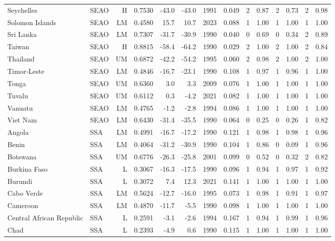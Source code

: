 \begin{longtable}{llrrrrrrrrrrrr}
Seychelles & SEAO & H & 0.7530 & -43.0 & -43.0 & 1991 & 0.049 & 2 & 0.87 & 2 & 0.73 & 2 & 0.98 \\
Solomon Islands & SEAO & LM & 0.4580 &  15.7 &  10.7 & 2023 & 0.088 & 1 & 1.00 & 1 & 1.00 & 1 & 1.00 \\
Sri Lanka & SEAO & LM & 0.7307 & -31.7 & -30.9 & 1990 & 0.040 & 0 & 0.69 & 0 & 0.34 & 2 & 0.89 \\
Taiwan & SEAO & H & 0.8815 & -58.4 & -64.2 & 1990 & 0.029 & 2 & 1.00 & 2 & 1.00 & 2 & 0.84 \\
Thailand & SEAO & UM & 0.6872 & -42.2 & -54.2 & 1995 & 0.060 & 2 & 0.98 & 2 & 1.00 & 2 & 1.00 \\
Timor-Leste & SEAO & LM & 0.4846 & -16.7 & -23.1 & 1990 & 0.108 & 1 & 0.97 & 1 & 0.96 & 1 & 1.00 \\
Tonga & SEAO & UM & 0.6360 &   3.0 &   3.3 & 2009 & 0.076 & 1 & 1.00 & 1 & 1.00 & 1 & 1.00 \\
Tuvalu & SEAO & UM & 0.6112 &   0.3 &  -4.2 & 2021 & 0.082 & 1 & 1.00 & 1 & 1.00 & 1 & 1.00 \\
Vanuatu & SEAO & LM & 0.4765 &  -1.2 &  -2.8 & 1994 & 0.086 & 1 & 1.00 & 1 & 1.00 & 1 & 1.00 \\
Viet Nam & SEAO & LM & 0.6430 & -31.4 & -35.5 & 1990 & 0.064 & 0 & 0.25 & 0 & 0.26 & 1 & 0.82 \\
Angola & SSA & LM & 0.4991 & -16.7 & -17.2 & 1990 & 0.121 & 1 & 0.98 & 1 & 0.98 & 1 & 0.96 \\
Benin & SSA & LM & 0.4064 & -31.2 & -30.9 & 1990 & 0.104 & 1 & 0.86 & 0 & 0.09 & 1 & 0.96 \\
Botswana & SSA & UM & 0.6776 & -26.3 & -25.8 & 2001 & 0.099 & 0 & 0.52 & 0 & 0.32 & 2 & 0.82 \\
Burkina Faso & SSA & L & 0.3067 & -16.3 & -17.5 & 1990 & 0.096 & 1 & 0.94 & 1 & 0.97 & 1 & 0.92 \\
Burundi & SSA & L & 0.3072 &   7.4 &  12.3 & 2021 & 0.141 & 1 & 1.00 & 1 & 1.00 & 1 & 1.00 \\
Cabo Verde & SSA & LM & 0.5624 & -12.7 & -16.0 & 1995 & 0.073 & 1 & 0.98 & 1 & 0.91 & 1 & 0.97 \\
Cameroon & SSA & LM & 0.4870 & -11.7 &  -5.5 & 1990 & 0.098 & 1 & 1.00 & 1 & 1.00 & 1 & 1.00 \\
Central African Republic & SSA & L & 0.2591 &  -3.1 &  -2.6 & 1994 & 0.167 & 1 & 0.94 & 1 & 0.99 & 1 & 0.96 \\
Chad & SSA & L & 0.2393 &  -4.9 &   0.6 & 1990 & 0.115 & 1 & 1.00 & 1 & 1.00 & 1 & 1.00 \\

\end{longtable}
